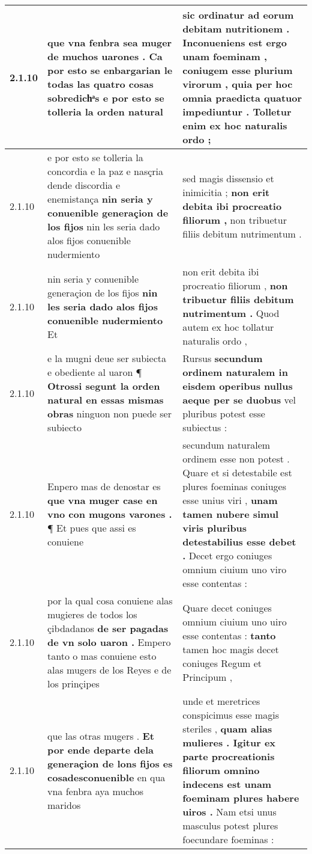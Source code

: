 \begin{tabular}{|p{1cm}|p{6.5cm}|p{6.5cm}|}
2.1.10 & que vna fenbra sea muger de muchos uarones . \textbf{ Ca por esto se enbargarian le todas las quatro cosas sobredichͣs } e por esto se tolleria la orden natural & sic ordinatur ad eorum debitam nutritionem . Inconueniens est ergo unam foeminam , coniugem esse plurium virorum , \textbf{ quia per hoc omnia praedicta quatuor impediuntur . } Tolletur enim ex hoc naturalis ordo ; \\\hline
2.1.10 & e por esto se tolleria la concordia e la paz e nasçria dende discordia e enemistança \textbf{ nin seria y conuenible generaçion de los fijos } nin les seria dado alos fijos conuenible nudermiento & sed magis dissensio et inimicitia ; \textbf{ non erit debita ibi procreatio filiorum , } non tribuetur filiis debitum nutrimentum . \\\hline
2.1.10 & nin seria y conuenible generaçion de los fijos \textbf{ nin les seria dado alos fijos conuenible nudermiento } Et & non erit debita ibi procreatio filiorum , \textbf{ non tribuetur filiis debitum nutrimentum . } Quod autem ex hoc tollatur naturalis ordo , \\\hline
2.1.10 & e la mugni deue ser subiecta e obediente al uaron ¶ \textbf{ Otrossi segunt la orden natural en essas mismas obras } ninguon non puede ser subiecto & Rursus \textbf{ secundum ordinem naturalem in eisdem operibus nullus aeque per se duobus } vel pluribus potest esse subiectus : \\\hline
2.1.10 & Enpero mas de denostar es \textbf{ que vna muger case en vno con mugons varones . } ¶ Et pues que assi es conuiene & secundum naturalem ordinem esse non potest . Quare et si detestabile est plures foeminas coniuges esse unius viri , \textbf{ unam tamen nubere simul viris pluribus detestabilius esse debet . } Decet ergo coniuges omnium ciuium uno viro esse contentas : \\\hline
2.1.10 & por la qual cosa conuiene alas mugieres de todos los çibdadanos \textbf{ de ser pagadas de vn solo uaron . } Empero tanto o mas conuiene esto alas mugers de los Reyes e de los prinçipes & Quare decet coniuges omnium ciuium uno uiro esse contentas : \textbf{ tanto } tamen hoc magis decet coniuges Regum et Principum , \\\hline
2.1.10 & que las otras mugers . \textbf{ Et por ende departe dela generaçion de lons fijos es cosadesconuenible } en qua vna fenbra aya muchos maridos & unde et meretrices conspicimus esse magis steriles , \textbf{ quam alias mulieres . Igitur ex parte procreationis filiorum omnino indecens est unam foeminam plures habere uiros . } Nam etsi unus masculus potest plures foecundare foeminas : \\\hline

\end{tabular}
